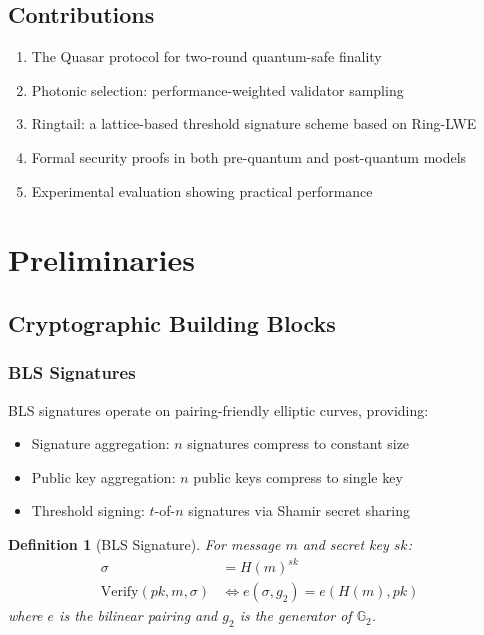 \documentclass[11pt,a4paper]{article}
\newtheorem{definition}{Definition}
\begin{document}
\subsection{Contributions}

\begin{enumerate}
    \item The Quasar protocol for two-round quantum-safe finality
    \item Photonic selection: performance-weighted validator sampling
    \item Ringtail: a lattice-based threshold signature scheme based on Ring-LWE
    \item Formal security proofs in both pre-quantum and post-quantum models
    \item Experimental evaluation showing practical performance
\end{enumerate}

\section{Preliminaries}

\subsection{Cryptographic Building Blocks}

\subsubsection{BLS Signatures}

BLS signatures operate on pairing-friendly elliptic curves, providing:
\begin{itemize}
    \item Signature aggregation: $n$ signatures compress to constant size
    \item Public key aggregation: $n$ public keys compress to single key
    \item Threshold signing: $t$-of-$n$ signatures via Shamir secret sharing
\end{itemize}

\begin{definition}[BLS Signature]
For message $m$ and secret key $sk$:
\begin{align}
\sigma &= H(m)^{sk} \\
\text{Verify}(pk, m, \sigma) &\iff e(\sigma, g_2) = e(H(m), pk)
\end{align}
where $e$ is the bilinear pairing and $g_2$ is the generator of $\mathbb{G}_2$.
\end{definition}
\end{document}
